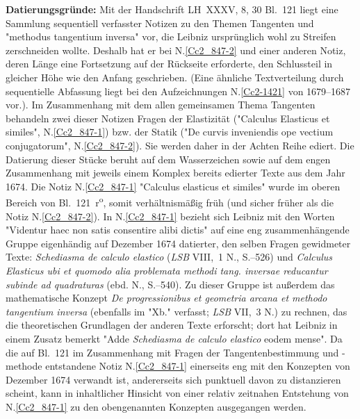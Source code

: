\begin{ledgroup}
\footnotesize
\pstart
\noindent
\textbf{Datierungsgründe:}
Mit der Handschrift LH~XXXV, 8, 30 Bl.~121 liegt
eine Sammlung sequentiell verfasster Notizen
zu den Themen Tangenten und "methodus tangentium inversa" vor,
die Leibniz ursprünglich wohl zu Streifen zerschneiden wollte. 
Deshalb hat er bei N.\;\ref{Cc2_847-2} und einer anderen Notiz, deren Länge eine Fortsetzung auf der Rückseite erforderte, den Schlussteil in gleicher Höhe wie den Anfang geschrieben. (Eine ähnliche Textverteilung durch sequentielle Abfassung liegt bei den Aufzeichnungen N.\;\ref{Cc2-1421} von 1679--1687 vor.).
\pend
\pstart
Im Zusammenhang mit dem allen gemeinsamen Thema Tangenten behandeln zwei dieser Notizen Fragen der Elastizität ("Calculus Elasticus et similes", N.\;\ref{Cc2_847-1}) bzw. der Statik ("De curvis inveniendis ope vectium conjugatorum", N.\;\ref{Cc2_847-2}). Sie werden daher in der Achten Reihe ediert.
\pend
\pstart
Die Datierung dieser Stücke beruht auf dem Wasserzeichen sowie auf dem engen Zusammenhang mit jeweils einem Komplex bereits edierter Texte aus dem Jahr 1674.
\pend
\pstart
Die Notiz N.\;\ref{Cc2_847-1} "Calculus elasticus et similes" wurde im oberen Bereich von Bl.~121~r\textsuperscript{o}, somit verhältnismäßig früh (und sicher früher als die Notiz N.\;\ref{Cc2_847-2}).
In N.\;\ref{Cc2_847-1} bezieht sich Leibniz mit den Worten "Videntur haec non satis consentire alibi dictis" auf eine eng zusammenhängende Gruppe eigenhändig auf Dezember 1674 datierter, den selben Fragen gewidmeter Texte: \cite{02608}\textit{Schediasma de calculo elastico} (\textit{LSB} VIII,~1 N., S.--526) und \cite{02609}\textit{Calculus Elasticus ubi et quomodo alia problemata methodi tang. inversae reducantur subinde ad quadraturas} (ebd. N., S.--540).
Zu dieser Gruppe ist außerdem das mathematische Konzept
\cite{00261}\textit{De progressionibus et geometria arcana et methodo tangentium inversa} (ebenfalls im "Xb." verfasst; \textit{LSB} VII,~3 N.) zu rechnen, das die theoretischen Grundlagen der anderen Texte erforscht; dort hat Leibniz in einem Zusatz bemerkt "Adde \textit{Schediasma de calculo elastico}  eodem mense".
\pend
\pstart
Da die auf Bl.~121 im Zusammenhang mit Fragen der Tangentenbestimmung und -methode entstandene Notiz N.\;\ref{Cc2_847-1} einerseits eng mit den Konzepten von Dezember 1674 verwandt ist, andererseits sich punktuell davon zu distanzieren scheint, kann in inhaltlicher Hinsicht von einer relativ zeitnahen Entstehung von N.\;\ref{Cc2_847-1} zu den obengenannten Konzepten ausgegangen werden.

\end{ledgroup}
